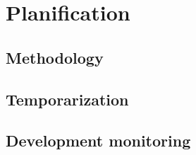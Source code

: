 \chapter{Planification}

\section{Methodology}


\section{Temporarization}

\section{Development monitoring}
